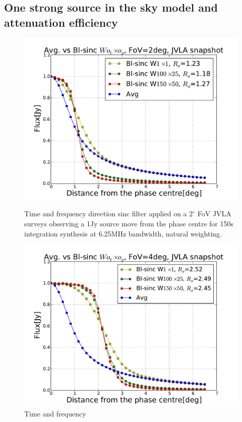 \documentclass[useAMS,usenatbib]{mn2e}
\begin{document}
\subsection{One strong source in the sky model and attenuation efficiency}
\begin{figure}
  \centering
\begin{minipage}{0.36\linewidth}\includegraphics[width=1\textwidth]{./Figures/Bl-sinc-FoV2-vla.pdf}\caption{Time and frequency 
direction sinc filter applied on a $2^{\circ}$ FoV JVLA surveys observing a 1Jy source move from the phase centre for 150s integration 
synthesis at 6.25MHz bandwidth, natural weighting.}\label{fig:Bl-sinc-FoV2}\end{minipage}
\hspace{1cm}
\begin{minipage}{0.36\linewidth}\includegraphics[width=1\textwidth]{./Figures/Bl-sinc-FoV4-vla.pdf}\caption{Time and frequency 
}
\end{minipage}
\end{figure}
\end{document}
